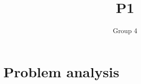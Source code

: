 \documentclass[11pt]{report}
\title{P1}
\author{Group 4}
\begin{document}
    \maketitle


    \chapter{Problem analysis}\label{ch:problem-analysis}

    
    
    
    
    
    
    

    
    
\end{document}

